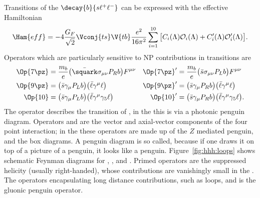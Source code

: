 Transitions of the \fcnc $\decay{b}{s\ell^+\ell^-}$ can be expressed with the effective Hamiltonian
\begin{equation}
  \Ham{eff} = -4\frac{G_F}{\sqrt{2}}\Vconj{ts}\V{tb}\frac{e^2}{16\pi^2}
  \sum_{i=1}^{10}\big[C_i(\Lambda)\mathcal{O}_i(\Lambda)
    +C_i^\prime(\Lambda)\mathcal{O}_i^\prime(\Lambda)\big].
\end{equation}
Operators which are particularly sensitive to NP contributions in  transitions are
\begin{align}
  \Op{7\pz} &= \frac{m_b}{e}\big(\bar\squark\sigma_{\mu\nu}P_Rb\big)F^{\mu\nu}
  &\Op{7\pz}^\prime &= \frac{m_b}{e}\big(\bar s \sigma_{\mu\nu}P_Lb\big)F^{\mu\nu}
  \nonumber\\
  \Op{9\pz} &= \big(\bar s\gamma_\mu P_Lb\big)\big(\bar\ell\gamma^\mu\ell\big)
  &\Op{9\pz}^\prime &= \big(\bar s\gamma_\mu P_Rb\big)\big(\bar\ell\gamma^\mu\ell\big)
  \nonumber\\
  \Op{10} &= \big(\bar s\gamma_\mu P_Lb\big)\big(\bar\ell\gamma^\mu\gamma_5\ell\big)
  &\Op{10}^\prime &= \big(\bar s\gamma_\mu P_Rb\big)\big(\bar\ell\gamma^\mu\gamma_5\ell\big).
\end{align}
The operator  describes the transition of \decay{\bquark}{\squark\gamma}, in the \sm this is
via a photonic penguin diagram.
Operators  and  are the vector and axial-vector components of the four point
\decay{\bquark}{\squark\mumu} interaction; in the \sm these operators are made up of the $Z$
mediated penguin, and the \Wp box diagrams.
A penguin diagram is so called, because if one draws it on top of a picture of a penguin, it looks
like a penguin.
Figure~\ref{fig:hhh:loops} shows schematic Feynman diagrams for , , and .
Primed operators are the suppressed helicity (usually right-handed), whose contributions are
vanishingly small in the \sm.
The operators  encapsulating long distance contributions, such as \ccbar
loops, and  is the gluonic penguin operator.

